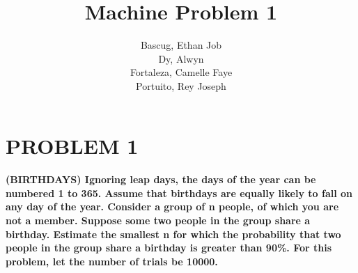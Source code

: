 \documentclass[12pt,letterpaper]{article}
\title{Machine Problem 1}
\date{}
\author{Bascug, Ethan Job \\Dy, Alwyn \\ Fortaleza, Camelle Faye \\Portuito, Rey Joseph}
\begin{document}
\maketitle

\section*{PROBLEM 1}
\paragraph*{\textbf{(BIRTHDAYS)} Ignoring leap days, the days of the year can be numbered 1 to 365. Assume that birthdays are equally likely to fall on any day of the year. Consider a group of n people, of which you are not a member. Suppose some two people in the group share a birthday. Estimate the smallest n for which the probability that two people in the group share a birthday is greater than 90\%. For this problem, let the number of trials be 10000.}
\end{document}

